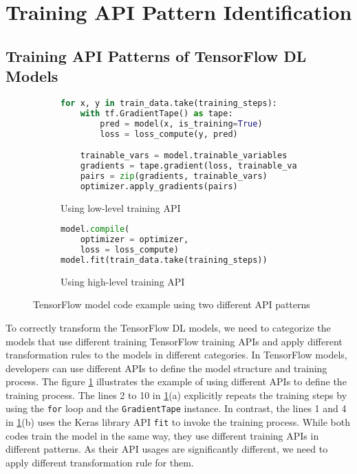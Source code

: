 \pagebreak
\section{Training API Pattern Identification}\label{sec:pattern}

\subsection{Training API Patterns of TensorFlow DL Models}

\begin{figure}[ht!]
\centering
  \begin{subfigure}[b]{0.4\textwidth}
    \begin{lstlisting}[language=Python]
for x, y in train_data.take(training_steps):
    with tf.GradientTape() as tape:
        pred = model(x, is_training=True)
        loss = loss_compute(y, pred)

    trainable_vars = model.trainable_variables
    gradients = tape.gradient(loss, trainable_vars)
    pairs = zip(gradients, trainable_vars)
    optimizer.apply_gradients(pairs) 
    \end{lstlisting}
    \caption{Using low-level training API}
  \end{subfigure}
  \hspace{5mm}
  \begin{subfigure}[b]{0.45\textwidth}
    \begin{lstlisting}[language=Python]
model.compile(
    optimizer = optimizer, 
    loss = loss_compute) 
model.fit(train_data.take(training_steps))
    \end{lstlisting} 
    \caption{Using high-level training API}
  \end{subfigure}

  \caption{TensorFlow model code example using two different API patterns}
  \label{fig:pattern:ex01}
\end{figure}

To correctly transform the TensorFlow DL models,
we need to categorize the models that use different training TensorFlow training
APIs and apply different transformation rules 
to the models in different categories.
In TensorFlow models, developers can use different APIs to define the 
model structure and training process.
The figure \ref{fig:pattern:ex01} illustrates the example of using 
different APIs to define the training process.
The lines 2 to 10 in \ref{fig:pattern:ex01}(a)  
explicitly repeats the training steps by using the {\tt for} loop
and the {\tt GradientTape} instance.
In contrast, the lines 1 and 4 in \ref{fig:pattern:ex01}(b)
uses the Keras library API {\tt fit} to invoke the training process.
While both codes train the model in the same way, they use different training 
APIs in different patterns.
As their API usages are significantly different, we need to apply different
transformation rule for them.

